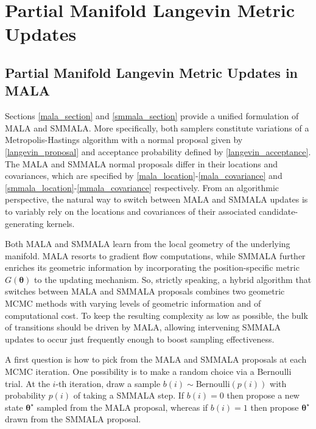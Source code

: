\documentclass[twoside,11pt]{article}
\begin{document}
\section{Partial Manifold Langevin Metric Updates}

\subsection{Partial Manifold Langevin Metric Updates in MALA}

Sections \ref{mala_section} and \ref{smmala_section} provide a unified formulation of MALA and SMMALA. More specifically, 
both samplers constitute variations of a Metropolis-Hastings algorithm with a normal proposal given by 
\eqref{langevin_proposal} and acceptance probability defined by \eqref{langevin_acceptance}. The MALA and SMMALA normal 
proposals differ in their locations and covariances, which are specified by \eqref{mala_location}-\eqref{mala_covariance} 
and \eqref{smmala_location}-\eqref{mmala_covariance} respectively. From an algorithmic perspective, the natural way to 
switch between MALA and SMMALA updates is to variably rely on the locations and covariances of their associated 
candidate-generating kernels.

Both MALA and SMMALA learn from the local geometry of the underlying manifold. MALA resorts to gradient flow computations, 
while SMMALA further enriches its geometric information by incorporating the position-specific metric 
$G(\boldsymbol{\theta})$ to the updating mechanism. So, strictly speaking, a hybrid algorithm that switches between MALA and 
SMMALA proposals combines two geometric MCMC methods with varying levels of geometric information and of computational cost. 
To keep the resulting complexity as low as possible, the bulk of transitions should be driven by MALA, allowing intervening 
SMMALA updates to occur just frequently enough to boost sampling effectiveness.

A first question is how to pick from the MALA and SMMALA proposals at each MCMC iteration. One possibility is to make a
random choice via a Bernoulli trial. At the $i$-th iteration, draw a sample $b(i)\sim \mbox{Bernoulli}(p(i))$ with
probability $p(i)$ of taking a SMMALA step. If $b(i)=0$ then propose a new state $\boldsymbol{\theta}^{\star}$ sampled from
the MALA proposal, whereas if $b(i)=1$ then propose $\boldsymbol{\theta}^{\star}$ drawn from the SMMALA proposal.
\end{document}
